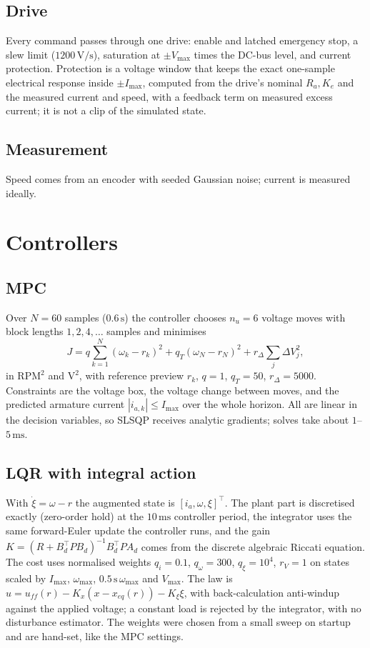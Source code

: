 \documentclass[11pt,a4paper]{article}
\begin{document}
\subsection{Drive}
Every command passes through one drive: enable and latched emergency stop, a slew limit (\(1200\,\si{\volt\per\second}\)), saturation at \(\pm V_{\max}\) times the DC-bus level, and current protection.
Protection is a voltage window that keeps the exact one-sample electrical response inside \(\pm I_{\max}\), computed from the drive's nominal \(R_a,K_e\) and the measured current and speed, with a feedback term on measured excess current; it is not a clip of the simulated state.

\subsection{Measurement}
Speed comes from an encoder with seeded Gaussian noise; current is measured ideally.

\section{Controllers}
\subsection{MPC}
Over \(N{=}60\) samples (\(0.6\,\si{\second}\)) the controller chooses \(n_u{=}6\) voltage moves with block lengths \(1,2,4,\dots\) samples and minimises
\begin{equation}
  J = q\sum_{k=1}^{N}(\omega_k-r_k)^2 + q_T(\omega_N-r_N)^2 + r_\Delta\sum_j\Delta V_j^2,
  \label{eq:cost}
\end{equation}
in \(\mathrm{RPM}^2\) and \(\si{\volt\squared}\), with reference preview \(r_k\), \(q{=}1\), \(q_T{=}50\), \(r_\Delta{=}5000\).
Constraints are the voltage box, the voltage change between moves, and the predicted armature current \(|i_{a,k}|\le I_{\max}\) over the whole horizon.
All are linear in the decision variables, so SLSQP receives analytic gradients; solves take about \(1\)--\(5\,\si{\milli\second}\).

\subsection{LQR with integral action}
With \(\dot\xi=\omega-r\) the augmented state is \([i_a,\omega,\xi]^\top\).
The plant part is discretised exactly (zero-order hold) at the \(10\,\si{\milli\second}\) controller period, the integrator uses the same forward-Euler update the controller runs, and the gain \(K=(R+B_d^\top PB_d)^{-1}B_d^\top PA_d\) comes from the discrete algebraic Riccati equation.
The cost uses normalised weights \(q_i{=}0.1\), \(q_\omega{=}300\), \(q_\xi{=}10^4\), \(r_V{=}1\) on states scaled by \(I_{\max}\), \(\omega_{\max}\), \(0.5\,\si{\second}\,\omega_{\max}\) and \(V_{\max}\).
The law is \(u=u_{ff}(r)-K_x(x-x_{eq}(r))-K_\xi\xi\), with back-calculation anti-windup against the applied voltage; a constant load is rejected by the integrator, with no disturbance estimator.
The weights were chosen from a small sweep on startup and are hand-set, like the MPC settings.
\end{document}
